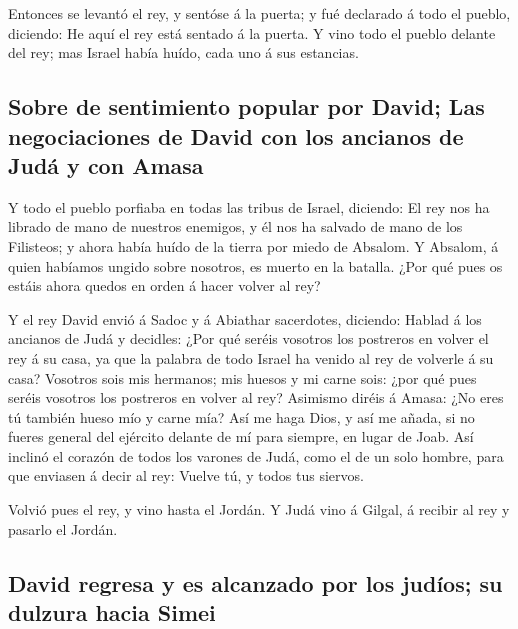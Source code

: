  Entonces se levantó el rey, y sentóse á la puerta; y fué
declarado á todo el pueblo, diciendo: He aquí el rey está sentado á la
puerta. Y vino todo el pueblo delante del rey; mas Israel había huído,
cada uno á sus estancias.

\hypertarget{sobre-de-sentimiento-popular-por-david-las-negociaciones-de-david-con-los-ancianos-de-juduxe1-y-con-amasa}{%
\subsection{Sobre de sentimiento popular por David; Las negociaciones de
David con los ancianos de Judá y con
Amasa}\label{sobre-de-sentimiento-popular-por-david-las-negociaciones-de-david-con-los-ancianos-de-juduxe1-y-con-amasa}}

 Y todo el pueblo porfiaba en todas las tribus de Israel,
diciendo: El rey nos ha librado de mano de nuestros enemigos, y él nos
ha salvado de mano de los Filisteos; y ahora había huído de la tierra
por miedo de Absalom.  Y Absalom, á quien habíamos ungido
sobre nosotros, es muerto en la batalla. ¿Por qué pues os estáis ahora
quedos en orden á hacer volver al rey?

 Y el rey David envió á Sadoc y á Abiathar sacerdotes,
diciendo: Hablad á los ancianos de Judá y decidles: ¿Por qué seréis
vosotros los postreros en volver el rey á su casa, ya que la palabra de
todo Israel ha venido al rey de volverle á su casa? 
Vosotros sois mis hermanos; mis huesos y mi carne sois: ¿por qué pues
seréis vosotros los postreros en volver al rey?  Asimismo
diréis á Amasa: ¿No eres tú también hueso mío y carne mía? Así me haga
Dios, y así me añada, si no fueres general del ejército delante de mí
para siempre, en lugar de Joab.  Así inclinó el corazón de
todos los varones de Judá, como el de un solo hombre, para que enviasen
á decir al rey: Vuelve tú, y todos tus siervos.

 Volvió pues el rey, y vino hasta el Jordán. Y Judá vino á
Gilgal, á recibir al rey y pasarlo el Jordán.

\hypertarget{david-regresa-y-es-alcanzado-por-los-juduxedos-su-dulzura-hacia-simei}{%
\subsection{David regresa y es alcanzado por los judíos; su dulzura
hacia
Simei}\label{david-regresa-y-es-alcanzado-por-los-juduxedos-su-dulzura-hacia-simei}}

